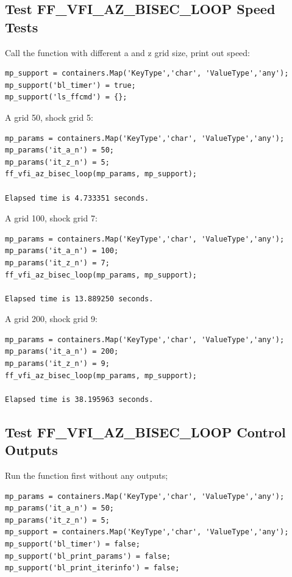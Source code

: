 \documentclass[
]{book}
\begin{document}
\hypertarget{test-ff_vfi_az_bisec_loop-speed-tests}{%
\subsection{Test FF\_VFI\_AZ\_BISEC\_LOOP Speed Tests}\label{test-ff_vfi_az_bisec_loop-speed-tests}}

Call the function with different a and z grid size, print out speed:

\begin{verbatim}
mp_support = containers.Map('KeyType','char', 'ValueType','any');
mp_support('bl_timer') = true;
mp_support('ls_ffcmd') = {};
\end{verbatim}

A grid 50, shock grid 5:

\begin{verbatim}
mp_params = containers.Map('KeyType','char', 'ValueType','any');
mp_params('it_a_n') = 50;
mp_params('it_z_n') = 5;
ff_vfi_az_bisec_loop(mp_params, mp_support);

Elapsed time is 4.733351 seconds.
\end{verbatim}

A grid 100, shock grid 7:

\begin{verbatim}
mp_params = containers.Map('KeyType','char', 'ValueType','any');
mp_params('it_a_n') = 100;
mp_params('it_z_n') = 7;
ff_vfi_az_bisec_loop(mp_params, mp_support);

Elapsed time is 13.889250 seconds.
\end{verbatim}

A grid 200, shock grid 9:

\begin{verbatim}
mp_params = containers.Map('KeyType','char', 'ValueType','any');
mp_params('it_a_n') = 200;
mp_params('it_z_n') = 9;
ff_vfi_az_bisec_loop(mp_params, mp_support);

Elapsed time is 38.195963 seconds.
\end{verbatim}

\hypertarget{test-ff_vfi_az_bisec_loop-control-outputs}{%
\subsection{Test FF\_VFI\_AZ\_BISEC\_LOOP Control Outputs}\label{test-ff_vfi_az_bisec_loop-control-outputs}}

Run the function first without any outputs;

\begin{verbatim}
mp_params = containers.Map('KeyType','char', 'ValueType','any');
mp_params('it_a_n') = 50;
mp_params('it_z_n') = 5;
mp_support = containers.Map('KeyType','char', 'ValueType','any');
mp_support('bl_timer') = false;
mp_support('bl_print_params') = false;
mp_support('bl_print_iterinfo') = false;
\end{verbatim}
\end{document}
